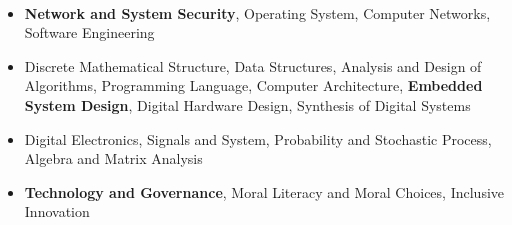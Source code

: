 \\[\lsep]

\begin{itemize}

	\itemsep-0.25em
	\item \textbf{Network and System Security}, Operating System, Computer Networks, Software Engineering
	\item Discrete Mathematical Structure, Data Structures, Analysis and Design of Algorithms, Programming Language, Computer Architecture, \textbf{Embedded System Design}, Digital Hardware Design, Synthesis of Digital Systems
	\item Digital Electronics, Signals and System, Probability and Stochastic Process, Algebra and Matrix Analysis
	\item \textbf{Technology and Governance}, Moral Literacy and Moral Choices, Inclusive Innovation

\end{itemize}

